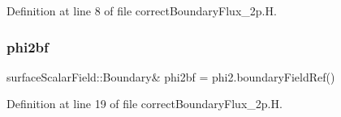 Definition at line 8 of file correct\+Boundary\+Flux\+\_\+2p.\+H.

\mbox{\label{correctBoundaryFlux__2p_8H_a8d8260a0363db4142f30c3172ff071fd}} 
\subsubsection{\texorpdfstring{phi2bf}{phi2bf}}
{\footnotesize\ttfamily surface\+Scalar\+Field\+::\+Boundary\& phi2bf = phi2.\+boundary\+Field\+Ref()}



Definition at line 19 of file correct\+Boundary\+Flux\+\_\+2p.\+H.

